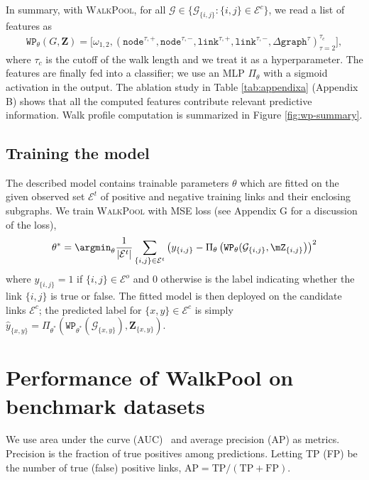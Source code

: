 \documentclass[11pt]{article}
\newcommand{\walkpool}{\textsc{WalkPool}\xspace}
\begin{document}
In summary, with \walkpool, for all $\mathcal{G}\in \{\mathcal{G}_{\{i,j\}}:\{i,j\}\in \mathcal{E}^c\}$, we read a list of features as
\begin{equation}\label{eq:wp_features}
\begin{split}
\mathtt{WP}_{\theta}(G,\mathbf{Z}) = \bigg[\omega_{1,2}, \left(\mathtt{node}^{\tau,+}, \mathtt{node}^{\tau,-}, \mathtt{link}^{\tau,+}, \mathtt{link}^{\tau,-}, \Delta \mathtt{graph}^{\tau}\right)_{\tau = 2}^{\tau_c} \bigg],
\end{split}
\end{equation}
where $\tau_c$ is the cutoff of the walk length and we treat it as a hyperparameter. The features are finally fed into a classifier; we use an MLP $\Pi_\theta$ with a sigmoid activation in the output. The ablation study in Table \ref{tab:appendixa} (Appendix B) shows that all the computed features contribute relevant predictive information. Walk profile computation is summarized in Figure \ref{fig:wp-summary}.
\vspace{-1mm}
\subsection{Training the model}
\vspace{-1mm}
The described model contains trainable parameters $\theta$ which are fitted on the given observed set $\mathcal{E}^t$ of positive and negative training links and their enclosing subgraphs.
We train \walkpool with MSE loss (see Appendix G for a discussion of the loss),
$$
    \theta^* = \argmin_\theta \frac{1}{\vert \mathcal{E}^t \vert}  \sum_{\{i,j\}\in \mathcal{E}^t} \left(y_{\{i, j\}}-\Pi_{\theta}\left(\mathtt{WP}_\theta(\mathcal{G}_{\{i, j\}}, \mZ_{\{i, j\}}\right)\right)^2
$$
where $y_{\{i, j\}} = 1$ if $\{ i,j \} \in \mathcal{E}^o$ and $0$ otherwise is the label indicating whether the link $\{i, j\}$ is true or false. The fitted model is then deployed on the candidate links $\mathcal{E}^c$; the predicted label for $\{x, y\} \in \mathcal{E}^c$ is simply
$
    \widehat{y}_{\{x, y\}} = \Pi_{\theta^*}(\mathtt{WP}_{\theta^*} (\mathcal{G}_{\{x, y\}}), \mathbf{Z}_{\{x, y\}}).
$
\vspace{-1mm}
\section{Performance of WalkPool on benchmark datasets}
\vspace{-1mm}
We use area under the curve (AUC)~\citep{bradley1997use} and average precision (AP) as metrics. Precision is the fraction of true positives among predictions.
Letting TP (FP) be the number of true (false) positive links, 
$\text{AP} ={\text{TP}}/({\text{TP}+\text{FP}}).
$\vspace{-4mm}
\end{document}
